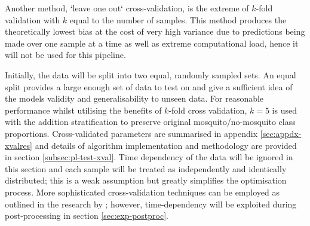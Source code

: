         Another method, `leave one out` cross-validation, is the extreme of $k$-fold validation with $k$ equal to the number of samples. This method produces the theoretically lowest bias at the cost of very high variance due to predictions being made over one sample at a time as well as extreme computational load, hence it will not be used for this pipeline.

        Initially, the data will be split into two equal, randomly sampled sets. An equal split provides a large enough set of data to test on and give a sufficient idea of the models validity and generalisability to unseen data. For reasonable performance whilst utilising the benefits of $k$-fold cross validation, $k=5$ is used with the addition stratification to preserve original mosquito/no-mosquito class proportions. Cross-validated parameters are summarised in appendix \ref{sec:appdx-xvalres} and details of algorithm implementation and methodology are provided in section \ref{subsec:pl-test-xval}. Time dependency of the data will be ignored in this section and each sample will be treated as independently and identically distributed; this is a weak assumption but greatly simplifies the optimisation process. More sophisticated cross-validation techniques can be employed as outlined in the research by \textcite{Yang2001}; however, time-dependency will be exploited during post-processing in section \ref{sec:exp-postproc}.
        
        
    
        
     
         
  
    
        
